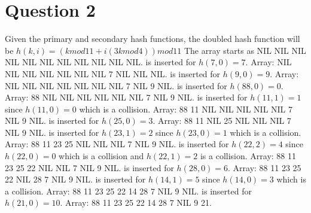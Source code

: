 \section{Question 2}
Given the primary and secondary hash functions, the doubled hash function will be $h(k, i) = (k mod 11 + i(3k mod 4)) mod 11$ \linebreak
The array starts as NIL NIL NIL NIL NIL NIL NIL NIL NIL NIL NIL. is inserted for $h(7, 0) = 7$. \linebreak
Array: NIL NIL NIL NIL NIL NIL NIL 7 NIL NIL NIL. is inserted for $h(9, 0) = 9$. \linebreak
Array: NIL NIL NIL NIL NIL NIL NIL 7 NIL 9 NIL. is inserted for $h(88, 0) = 0$. \linebreak
Array: 88 NIL NIL NIL NIL NIL NIL 7 NIL 9 NIL. is inserted for $h(11, 1) = 1$ since $h(11, 0) = 0$ which is a collision. \linebreak
Array: 88 11 NIL NIL NIL NIL NIL 7 NIL 9 NIL. is inserted for $h(25, 0) = 3$. \linebreak
Array: 88 11 NIL 25 NIL NIL NIL 7 NIL 9 NIL. is inserted for $h(23, 1) = 2$ since $h(23, 0) = 1$ which is a collision.\linebreak
Array: 88 11 23 25 NIL NIL NIL 7 NIL 9 NIL. is inserted for $h(22, 2) = 4$ since $h(22, 0) = 0$ which is a collision and $h(22, 1) = 2$ is a collision.\linebreak
Array: 88 11 23 25 22 NIL NIL 7 NIL 9 NIL. is inserted for $h(28, 0) = 6$.\linebreak
Array: 88 11 23 25 22 NIL 28 7 NIL 9 NIL. is inserted for $h(14, 1) = 5$ since $h(14, 0) = 3$ which is a collision.\linebreak
Array: 88 11 23 25 22 14 28 7 NIL 9 NIL. is inserted for $h(21, 0) = 10$.\linebreak
Array: 88 11 23 25 22 14 28 7 NIL 9 21.\linebreak